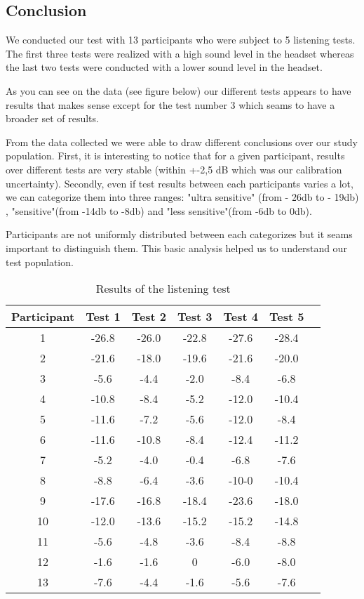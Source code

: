 \subsection{Conclusion}

We conducted our test with 13 participants who were subject to 5 listening tests. The first three tests were realized with a high sound level in the headset whereas the last two tests were conducted with a lower sound level in the headset. 

As you can see on the data (see figure below) our different tests appears to have results that makes sense except for the test number 3 which seams to have a broader set of results.  

From the data collected we were able to draw different conclusions over our study population. 
First, it is interesting to notice that for a given participant, results over different tests are very stable (within +-2,5 dB which was our calibration uncertainty).  Secondly, even if test results between each participants varies a lot, we can categorize  them into three ranges: "ultra sensitive" (from - 26db to - 19db) , "sensitive"(from -14db to -8db) and "less sensitive"(from -6db to 0db). 

Participants are not uniformly distributed between each categorizes but it seams important to distinguish them. This basic analysis helped us to understand our test population.

\begin{table}[H]
\centering
\begin{tabular}{*{7}{c}}
  \hline
  Participant & Test 1 & Test 2 & Test 3  & Test 4  & Test 5  
  \\
  \hline
  1 & -26.8 & -26.0 &	-22.8 & -27.6 & -28.4 \\
  2 & -21.6 & -18.0 & -19.6  & -21.6  & -20.0 \\
  3 & -5.6 & -4.4 & -2.0 & -8.4 & -6.8  \\
  4 & -10.8 & -8.4 & -5.2 & -12.0 & -10.4 \\
  5 & -11.6 & -7.2 & -5.6	 & -12.0 & -8.4 \\
  6 & -11.6 & -10.8 & -8.4 & -12.4 & -11.2 \\
  7 & -5.2 & -4.0 & -0.4 & -6.8 & -7.6 \\
  8 & -8.8 & -6.4 & -3.6 & -10-0 & -10.4 \\
  9 & -17.6 & -16.8 & -18.4 & -23.6 & -18.0 \\
  10 & -12.0 & -13.6 & -15.2 & -15.2 & 	-14.8 \\
  11 & -5.6 & -4.8 & -3.6 & -8.4 & -8.8 \\
  12 & -1.6 & -1.6 & 0	 & -6.0 & 	-8.0 \\
  13 & -7.6 & -4.4 & -1.6	 & -5.6 & 	-7.6   \\
  \hline
\end{tabular}
  \caption{Results of the listening test}
	\label{tab:ListeningResults}
\end{table}

